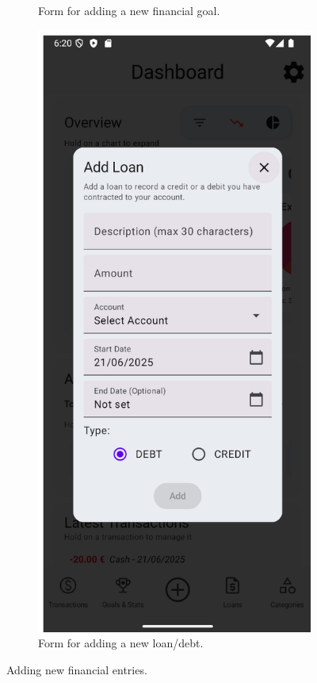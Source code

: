 \documentclass[a4paper,12pt]{article}
\begin{document}
\begin{figure}[H]
\begin{subfigure}[b]{0.23\textwidth}
        \caption{Form for adding a new financial goal.}
        \label{fig:add_goal_form}
    \end{subfigure}
    \hfill
    \begin{subfigure}[b]{0.23\textwidth}
        \includegraphics[width=\textwidth]{add_loan_dialog.png}
        \caption{Form for adding a new loan/debt.}
        \label{fig:add_loan_form}
    \end{subfigure}
    \caption{Adding new financial entries.}
    \label{fig:adding_entries}
\end{figure}
\end{document}

